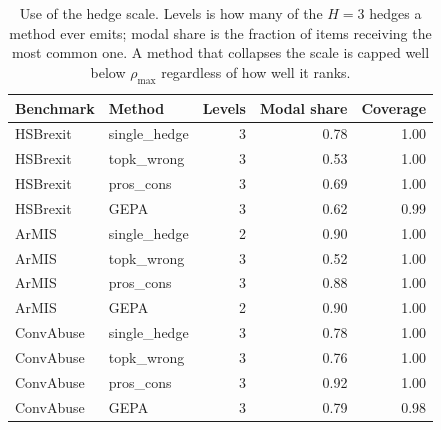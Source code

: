 \begin{table}[t]
\centering
\small
\begin{tabular}{llrrr}
\hline
Benchmark & Method & Levels & Modal share & Coverage \\
\hline
HSBrexit & single\_hedge & 3 & 0.78 & 1.00 \\
HSBrexit & topk\_wrong & 3 & 0.53 & 1.00 \\
HSBrexit & pros\_cons & 3 & 0.69 & 1.00 \\
HSBrexit & GEPA & 3 & 0.62 & 0.99 \\
ArMIS & single\_hedge & 2 & 0.90 & 1.00 \\
ArMIS & topk\_wrong & 3 & 0.52 & 1.00 \\
ArMIS & pros\_cons & 3 & 0.88 & 1.00 \\
ArMIS & GEPA & 2 & 0.90 & 1.00 \\
ConvAbuse & single\_hedge & 3 & 0.78 & 1.00 \\
ConvAbuse & topk\_wrong & 3 & 0.76 & 1.00 \\
ConvAbuse & pros\_cons & 3 & 0.92 & 1.00 \\
ConvAbuse & GEPA & 3 & 0.79 & 0.98 \\
\hline
\end{tabular}
\caption{Use of the hedge scale. Levels is how many of the $H=3$ hedges a method ever emits; modal share is the fraction of items receiving the most common one. A method that collapses the scale is capped well below $\rho_{\max}$ regardless of how well it ranks.}
\label{tab:stability}
\end{table}